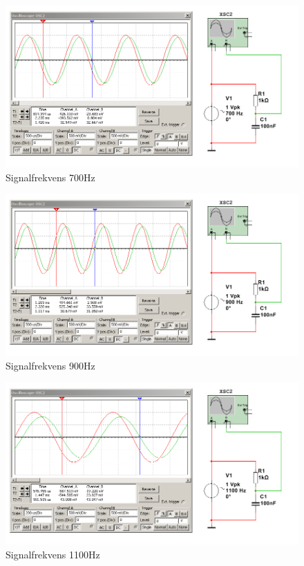 \documentclass[11pt,a4paper]{article}
\begin{document}
\begin{figure}[htbp]
    \centering
    \includegraphics[scale=0.5]{ee466multisim/5-700Hz.png}
    \caption{Signalfrekvens 700Hz}
    \label{fig:sim-5-700Hz}
\end{figure}

\begin{figure}[htbp]
    \centering
    \includegraphics[scale=0.5]{ee466multisim/5-900Hz.png}
    \caption{Signalfrekvens 900Hz}
    \label{fig:sim-5-900Hz}
\end{figure}

\begin{figure}[htbp]
    \centering
    \includegraphics[scale=0.5]{ee466multisim/5-1100Hz.png}
    \caption{Signalfrekvens 1100Hz}
    \label{fig:sim-5-1100Hz}
\end{figure}
\end{document}
